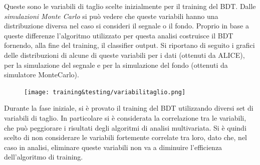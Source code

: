         
   Queste sono le variabili di taglio scelte inizialmente per il training del BDT. Dalle \textit{simulazioni Monte Carlo} si può vedere che queste variabili hanno una distribuzione diversa nel caso si consideri il segnale o il fondo. Proprio in base a queste differenze l'algoritmo utilizzato per questa analisi costruisce il BDT fornendo, alla fine del training, il classifier output. Si riportano di seguito i grafici delle distribuzioni di alcune di queste variabili per i dati (ottenuti da ALICE), per la simulazione del segnale e per la simulazione del fondo (ottenuti da simulatore MonteCarlo).
   
    \begin{figure}[htbp] %
        \centering
        \texttt{[image: training\&testing/variabilitaglio.png]}
        \caption{}
        \label{fig:variabilitaglio}
    \end{figure}
   
   
    Durante la fase iniziale, si è provato il training del BDT utilizzando diversi set di variabili di taglio. In particolare si è considerata la correlazione tra le variabili, che può peggiorare i risultati degli algoritmi di analisi multivariata. Si è quindi scelto di non considerare le variabili fortemente correlate tra loro, dato che, nel caso in analisi, eliminare queste variabili non va a diminuire l'efficienza dell'algoritmo di training. 
    
